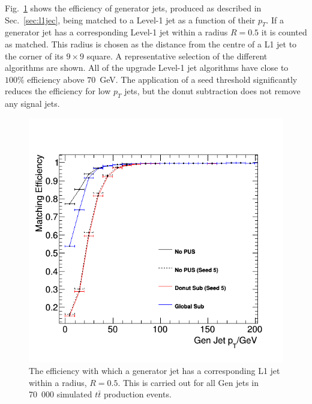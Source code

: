 Fig.~\ref{fig:matchingeff} shows the efficiency of generator jets,
produced as described in Sec.~\ref{sec:l1jec}, being matched to a
Level-1 jet as a function of their $p_T$. If a generator jet has a
corresponding Level-1 jet within a radius $R=0.5$ it is counted as
matched.
This radius is chosen as the distance from the centre of a L1 jet to
the corner of its $9\times9$ square. A representative selection of the
different \PUS algorithms are shown. All of the upgrade Level-1 jet
algorithms have close to $100\%$ efficiency above $70$~GeV. The
application of a seed threshold significantly reduces the efficiency
for low $p_T$ jets, but the donut subtraction does not remove any
signal jets.
\begin{figure}
	\begin{center}
		\includegraphics[width=0.6\linewidth]{figs/trigger/performance/matchingeff_alljet}
	\end{center}
	\caption{The efficiency with which a generator jet has a
  corresponding L1 jet within a radius, $R=0.5$. This is carried out
  for all Gen jets in 70~000 simulated $t\bar{t}$ production events.}
	\label{fig:matchingeff}
\end{figure}

